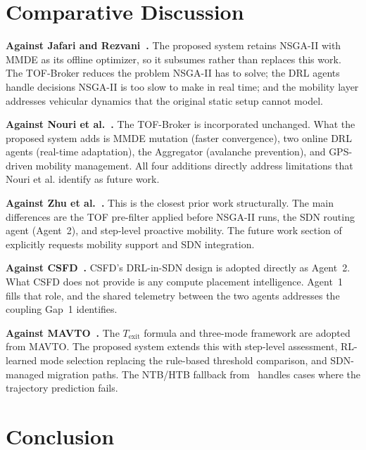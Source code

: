 \documentclass[12pt,a4paper]{article}
\begin{document}
\section{Comparative Discussion}
\label{sec:discussion}

\textbf{Against Jafari and Rezvani~\cite{jafari2021}.} The proposed system
retains NSGA-II with MMDE as its offline optimizer, so it subsumes rather than
replaces this work. The TOF-Broker reduces the problem NSGA-II has to solve; the
DRL agents handle decisions NSGA-II is too slow to make in real time; and the
mobility layer addresses vehicular dynamics that the original static setup cannot
model.

\textbf{Against Nouri et al.~\cite{nouri2024tof}.} The TOF-Broker is incorporated
unchanged. What the proposed system adds is MMDE mutation (faster convergence),
two online DRL agents (real-time adaptation), the Aggregator (avalanche prevention),
and GPS-driven mobility management. All four additions directly address limitations
that Nouri et al. identify as future work.

\textbf{Against Zhu et al.~\cite{zhu2025dag}.} This is the closest prior work
structurally. The main differences are the TOF pre-filter applied before NSGA-II
runs, the SDN routing agent (Agent~2), and step-level proactive mobility. The
future work section of~\cite{zhu2025dag} explicitly requests mobility support and
SDN integration.

\textbf{Against CSFD~\cite{csfd2025}.} CSFD's DRL-in-SDN design is adopted
directly as Agent~2. What CSFD does not provide is any compute placement
intelligence. Agent~1 fills that role, and the shared telemetry between the two
agents addresses the coupling Gap~1 identifies.

\textbf{Against MAVTO~\cite{mavto2024}.} The $T_\mathrm{exit}$ formula and
three-mode framework are adopted from MAVTO. The proposed system extends this with
step-level assessment, RL-learned mode selection replacing the rule-based threshold
comparison, and SDN-managed migration paths. The NTB/HTB fallback from~\cite{paper5_mobility}
handles cases where the trajectory prediction fails.

\section{Conclusion}
\label{sec:conclusion}
\end{document}
